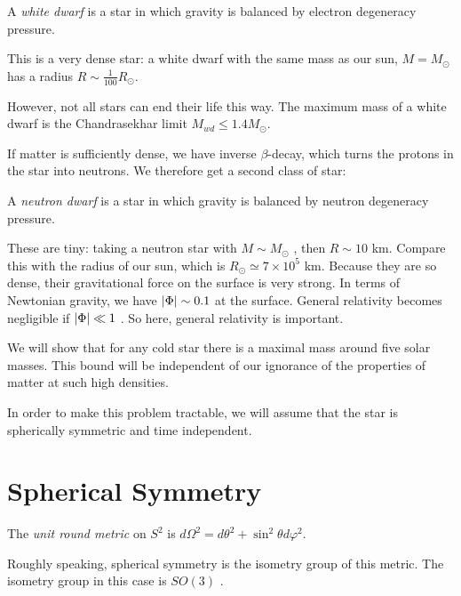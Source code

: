 \begin{definition}[]
  A \emph{white dwarf} is a star in which gravity is balanced by electron degeneracy pressure.
\end{definition}
This is a very dense star: a white dwarf with the same mass as our sun, $M = M_{\odot}$ has a radius $R \sim \frac{1}{100} R_{\odot}$.

However, not all stars can end their life this way. The maximum mass of a white dwarf is the Chandrasekhar limit $M_{wd} \leq 1.4 M_{\odot}$.

If matter is sufficiently dense, we have inverse $\beta$-decay, which turns the protons in the star into neutrons. 
We therefore get a second class of star:
\begin{definition}[]
  A \emph{neutron dwarf} is a star in which gravity is balanced by neutron degeneracy pressure.
\end{definition}
These are tiny: taking a neutron star with $M \sim M_{\odot}$ , then $R \sim 10$ km. Compare this with the radius of our sun, which is $R_{\odot} \simeq 7 \times 10^5$ km.
Because they are so dense, their gravitational force on the surface is very strong.
In terms of Newtonian gravity, we have $\abs{\Phi} \sim 0.1$ at the surface.
General relativity becomes negligible if $\abs{\Phi} \ll 1$ . So here, general relativity is important.

We will show that for any cold star there is a maximal mass around five solar masses.
This bound will be independent of our ignorance of the properties of matter at such high densities.

In order to make this problem tractable, we will assume that the star is spherically symmetric and time independent. 

\section{Spherical Symmetry}%
\label{sec:spherical_symmetry}

\begin{definition}[]
  The \emph{unit round metric} on $S^2$ is $d\Omega^2 = d\theta^2 + \sin^2\theta d\varphi^2$.
\end{definition}

Roughly speaking, spherical symmetry is the isometry group of this metric.
The isometry group in this case is $SO(3)$ .

